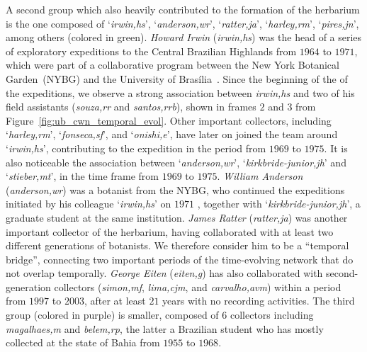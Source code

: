 A second group which also heavily contributed to the formation of the herbarium is the one composed of `\textit{irwin,hs}', `\textit{anderson,wr}', `\textit{ratter,ja}', `\textit{harley,rm}', `\textit{pires,jn}', among others (colored in green).
\textit{Howard Irwin} (\textit{irwin,hs}) was the head of a series of exploratory expeditions to the Central Brazilian Highlands from $1964$ to $1971$, which were part of a collaborative program between the New York Botanical Garden~(NYBG) and the University of Brasília~\cite{Irwin1996}.
Since the beginning of the of the expeditions, we observe a strong association between \textit{irwin,hs} and two of his field assistants (\textit{souza,rr} and \textit{santos,rrb}), shown in frames $2$ and $3$ from Figure~\ref{fig:ub_cwn_temporal_evol}.
Other important collectors, including `\textit{harley,rm}', `\textit{fonseca,sf}', and `\textit{onishi,e}', have later on joined the team around `\textit{irwin,hs}', contributing to the expedition in the period from $1969$ to $1975$.
%
It is also noticeable the association between `\textit{anderson,wr}', `\textit{kirkbride-junior,jh}' and `\textit{stieber,mt}', in the time frame from $1969$ to $1975$.
\textit{William Anderson} (\textit{anderson,wr}) was a botanist from the NYBG, who continued the expeditions initiated by his colleague `\textit{irwin,hs}' on $1971$ \cite{Irwin1996}, together with `\textit{kirkbride-junior,jh}', a graduate student at the same institution.
%
\textit{James Ratter} (\textit{ratter,ja}) was another important collector of the herbarium, having collaborated with at least two different generations of botanists.
We therefore consider him to be a ``temporal bridge'', connecting two important periods of the time-evolving network that do not overlap temporally.
\textit{George Eiten} (\textit{eiten,g}) has also collaborated with second-generation collectors (\textit{simon,mf}, \textit{lima,cjm}, and \textit{carvalho,avm}) within a period from $1997$ to $2003$, after at least $21$ years with no recording activities.
%
The third group (colored in purple) is smaller, composed of $6$ collectors including \textit{magalhaes,m} and \textit{belem,rp}, the latter a Brazilian student who has mostly collected at the state of Bahia from $1955$ to $1968$.

